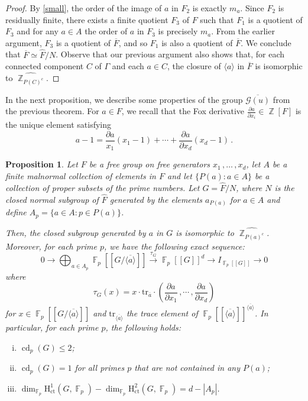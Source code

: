 \documentclass[a4paper]{amsart}
\newtheorem{pro}[lem]{Proposition}
\theoremstyle{definition}
\theoremstyle{remark}
\DeclareMathOperator{\bbz}{\mathbb{Z}}
\DeclareMathOperator{\bbf}{\mathbb{F}}
\DeclareMathOperator{\cd}{\mathrm{cd}}
\newcommand{\FFalgebra}[1]{\bbf_p[\![#1]\!]}
\newcommand{\G}{\mathcal G}
\newcommand{\HH}{\mathrm{H}}
\begin{document}
\begin{proof}
By \cref{small}, the order of the image of \(a\) in \(F_2\) is exactly \(m_a\). Since \(F_2\) is residually finite, there exists a finite quotient \(F_3\) of \(F\) such that \(F_1\) is a quotient of \(F_3\) and for any \(a \in A\) the order of \(a\) in \(F_3\) is precisely \(m_a\). From the earlier argument, \(F_3\) is a quotient of \(\overline{F}\), and so \(F_1\) is also a quotient of \(\overline{F}\). We conclude that \(\overline{F} \simeq \widehat{F}/N\). Observe that our previous argument also shows that, for each connected component \(C\) of \(\Gamma\) and each \(a\in C\), the closure of \(\langle a \rangle\) in \(\overline{F}\) is isomorphic to \(\widehat{\bbz_{P(C)^c}}\).
\end{proof}

In the next proposition, we describe some properties of the group \(\overline{\G(u)}\) from the previous theorem. For \(a \in F\), we recall that the Fox derivative \(\frac{\partial a}{\partial x_i} \in \bbz[F]\) is the unique element satisfying \[a - 1 = \frac{\partial a}{x_1}(x_1-1) + \cdots + \frac{\partial a}{\partial x_d}(x_d - 1)\,.\]

\begin{pro}\label{profpresent} Let \(F\) be a free group on free generators \(x_1\,,\ldots\,,x_d\), let \(A\) be a finite malnormal collection of elements in \(F\) and let \(\{P(a)\colon a \in A\}\) be a collection of proper subsets of the prime numbers. Let \(G = \widehat{F}/N\), where \(N\) is the closed normal subgroup of \(\widehat{F}\) generated by the elements \(a_{P(a)}\) for \(a \in A\) and define \(A_p = \{a \in A \colon p \in P(a)\}\).

Then, the closed subgroup generated by \(a\) in \(G\) is isomorphic to \(\widehat{\bbz_{P(a)^c}}\). Moreover, for each prime \(p\), we have the following exact sequence:
\begin{equation}\label{asphericity}
0 \to \bigoplus_{a \in A_p} \FFalgebra{G/\overline{\langle a \rangle}} \overset{\tau_G}{\to} \FFalgebra{G}^d \to I_{\FFalgebra{G}} \to 0
\end{equation}
where \[\tau_G(x) = x\cdot \mathrm{tr}_{\overline{a}} \cdot \left(\frac{\partial a}{\partial x_1}\,,\cdots\,,\frac{\partial a}{\partial x_d}\right)\] for \(x \in \FFalgebra{G/\overline{\langle a \rangle}}\) and \(\mathrm{tr}_{\overline{\langle a \rangle}}\) the trace element of \(\FFalgebra{\overline{\langle a \rangle}}^{\overline{\langle a \rangle}}\). In particular, for each prime \(p\), the following holds:
\begin{enumerate}[(i)]
    \item \(\cd_p(G) \leq 2\);
    \item \(\cd_p(G) = 1\) for all primes \(p\) that are not contained in any \(P(a)\);
    \item \(\dim_{\bbf_p} \HH^1_{\mathrm{ct}}(G,\bbf_p) - \dim_{\bbf_p} \HH^2_{\mathrm{ct}}(G,\bbf_p) = d - |A_p|\).
\end{enumerate}
\end{pro}
\end{document}
